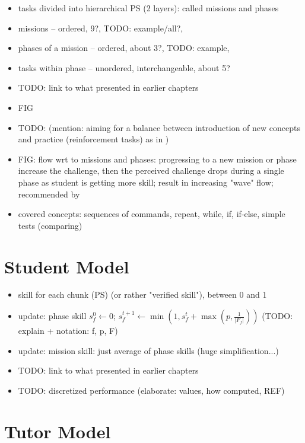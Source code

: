 \begin{itemize}
\item tasks divided into hierarchical PS (2 layers): called missions and phases
\item missions -- ordered, 9?, TODO: example/all?,
\item phases of a mission -- ordered, about 3?, TODO: example,
\item tasks within phase -- unordered, interchangeable, about 5?
\item TODO: link to what presented in earlier chapters
\item FIG
\item TODO: (mention: aiming for a balance between introduction of new concepts
and practice (reinforcement tasks) as in \cite{progression-analysis})
\item FIG: flow wrt to missions and phases:
  progressing to a new mission or phase increase the challenge,
  then the perceived challenge drops during a single phase as student is getting
  more skill; result in increasing "wave" flow; recommended by \cite{book-of-lenses}
\item covered concepts: sequences of commands, repeat, while, if, if-else, simple tests (comparing)
\end{itemize}


\section{Student Model}

\begin{itemize}
\item skill for each chunk (PS) (or rather "verified skill"), between 0 and 1
\item update: phase skill $s^0_f \leftarrow 0$;
  $s^{t+1}_f \leftarrow \min(1, s^t_f + \max(p, \frac{1}{|F_f|}))$
  (TODO: explain + notation: f, p, F)
\item update: mission skill: just average of phase skills (huge simplification...)
\item TODO: link to what presented in earlier chapters
\item TODO: discretized performance (elaborate: values, how computed, REF)
\end{itemize}


\section{Tutor Model}

